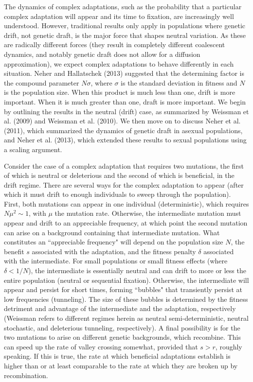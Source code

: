 \documentclass[10pt]{revtex4}
\begin{document}
The dynamics of complex adaptations, such as the probability that a particular complex adaptation will appear and its time to fixation, are increasingly well understood.
However, traditional results only apply in populations where genetic drift, not genetic draft, is the major force that shapes neutral variation.
As these are radically different forces (they result in completely different coalescent dynamics, and notably genetic draft does not allow for a diffusion approximation), we expect complex adaptations to behave differently in each situation.
Neher and Hallatschek (2013) suggested that the determining factor is the compound parameter $N\sigma$, where $\sigma$ is the standard deviation in fitness and $N$ is the population size.
When this product is much less than one, drift is more important.
When it is much greater than one, draft is more important.
We begin by outlining the results in the neutral (drift) case, as summarized by Weissman et al. (2009) and Weissman et al. (2010).
We then move on to discuss Neher et al. (2011), which summarized the dynamics of genetic draft in asexual populations, and Neher et al. (2013), which extended these results to sexual populations using a scaling argument.

Consider the case of a complex adaptation that requires two mutations, the first of which is neutral or deleterious and the second of which is beneficial, in the drift regime.
There are several ways for the complex adaptation to appear (after which it must drift to enough individuals to sweep through the population).
First, both mutations can appear in one individual (deterministic), which requires $N\mu^2 \sim 1$, with $\mu$ the mutation rate.
Otherwise, the intermediate mutation must appear and drift to an appreciable frequency, at which point the second mutation can arise on a background containing that intermediate mutation.
What constitutes an ``appreciable frequency" will depend on the population size $N$, the benefit $s$ associated with the adaptation, and the fitness penalty $\delta$ associated with the intermediate.
For small populations or small fitness effects (where $\delta < 1/N$), the intermediate is essentially neutral and can drift to more or less the entire population (neutral or sequential fixation).
Otherwise, the intermediate will appear and persist for short times, forming ``bubbles" that transiently persist at low frequencies (tunneling).
The size of these bubbles is determined by the fitness detriment and advantage of the intermediate and the adaptation, respectively (Weissman refers to different regimes herein as neutral semi-deterministic, neutral stochastic, and deleterious tunneling, respectively).
A final possibility is for the two mutations to arise on different genetic backgrounds, which recombine.
This can speed up the rate of valley crossing somewhat, provided that $s > r$, roughly speaking.
If this is true, the rate at which beneficial adaptations establish is higher than or at least comparable to the rate at which they are broken up by recombination.
\end{document}
